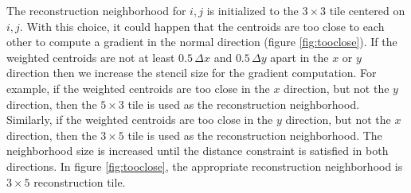 \begin{enumerate}
\begin{figure}
    \label{fig:centroids}
\end{figure}
The reconstruction neighborhood for $i,j$ is initialized to the $3 \times 3$ tile centered on $i,j$.
With this choice, it could happen that the centroids are too close to each other to compute a gradient in the normal direction (figure \ref{fig:tooclose}). If the weighted centroids are not at least $0.5\,\Delta x$  and $0.5\,\Delta y$ apart in the $x$ or $y$ direction then we increase the stencil size for the gradient computation.  For example, if the weighted centroids are too close in the $x$ direction, but not the $y$ direction, then the $5\times 3$ tile is used as the reconstruction neighborhood.  Similarly, if the weighted centroids are too close in the $y$ direction, but not the $x$ direction, then the $3\times 5$ tile is used as the reconstruction neighborhood.  The neighborhood size is increased until the distance constraint is satisfied in both directions.  In figure \ref{fig:tooclose}, the appropriate reconstruction neighborhood is $3\times 5$ reconstruction tile.


\end{enumerate}
